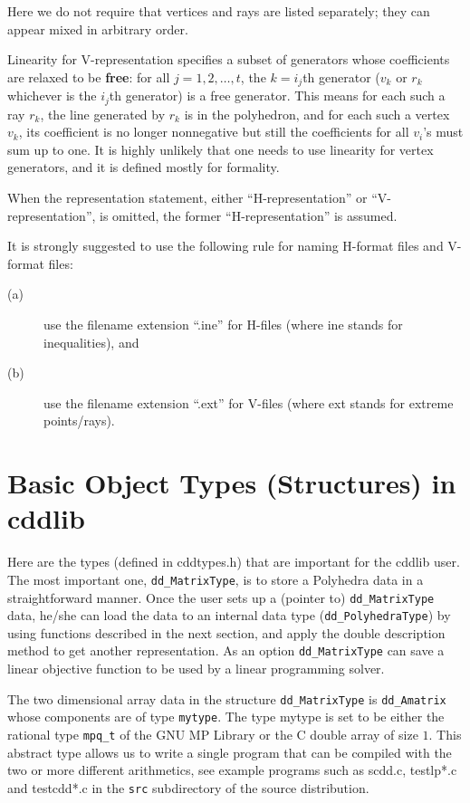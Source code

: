 \documentclass[11pt]{article}
\newcommand {\0} {{\bf 0}}
\begin{document}
\bigskip
\noindent
Here we do not require that
vertices and rays are listed
separately; they can appear mixed in arbitrary
order.

Linearity for V-representation specifies a subset of generators
whose coefficients are relaxed
to be {\bf free}:  for all $j=1,2, \ldots, t$, the $k=i_j$th generator ($v_{k}$ or $r_k$ whichever is the $i_j$th generator) is a free generator.
This means for each such a ray $r_k$,
the line generated by $r_k$ is in the polyhedron,
and for each such a vertex $v_k$, its coefficient is no longer nonnegative
but still the coefficients for all $v_i$'s must sum up to one.
It is highly unlikely that one needs to
use linearity for vertex generators, and it is defined mostly
for formality.

When the representation statement, either ``H-representation''
or ``V-representation'', is omitted, the former
``H-representation'' is assumed.

It is strongly suggested to use the following rule for naming
H-format files and V-format files:
\begin{description}
\item[(a)] use the filename  extension ``.ine'' for H-files (where ine stands for inequalities), and
\item[(b)]  use the filename  extension ``.ext'' for V-files (where ext stands for extreme points/rays).
\end{description}


\section{Basic Object Types (Structures) in cddlib}  \label{DATASTR}

Here are the types (defined in cddtypes.h) that are
important for the cddlib user.  The most important one,
{\tt dd\_MatrixType},
is to store a Polyhedra data in a straightforward manner.
Once the user sets up a (pointer to)  {\tt dd\_MatrixType} data,
he/she can load the data to an internal data type ({\tt dd\_PolyhedraType})
by using functions described in the next section, and apply
the double description method to get another representation.
As an option  {\tt dd\_MatrixType} can save a linear objective function
to be used by a linear programming solver.

The two dimensional array data in the structure {\tt dd\_MatrixType} is
{\tt dd\_Amatrix} whose components are of type {\tt mytype\/}.
The type mytype is set to be either the rational type {\tt mpq\_t} of
the GNU MP Library or the C double array of size $1$.
This abstract type allows us to write a single program that can
be compiled with the two or more different arithmetics, see example
programs such as scdd.c, testlp*.c and testcdd*.c
in the {\tt src} subdirectory of the source
distribution.
\end{document}
